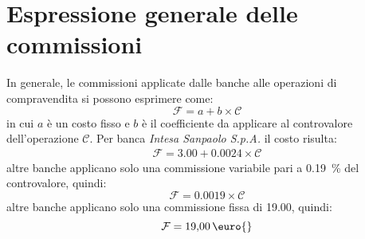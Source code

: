 \documentclass[12pt,a4paper]{article}
\newcommand{\IntesaSanpaolo}[0]{\emph{Intesa Sanpaolo S.p.A.}}
\newcommand{\Eur}[1]{\qty{#1}{\text{\euro{}}}}
\newcommand{\Cop}{\mathcal{C}}
\newcommand{\Fop}{\mathcal{F}}
\begin{document}

\appendix
\section{Espressione generale delle commissioni}


In  generale, le  commissioni applicate  dalle banche  alle operazioni  di compravendita  si possono
esprimere come:
\begin{equation*}
  \Fop{} = a + b \times{} \Cop{}
\end{equation*}
in cui \(a\) è un costo fisso e \(b\) è il coefficiente da applicare al controvalore dell'operazione
\(\Cop{}\).  Per banca \IntesaSanpaolo{} il costo risulta:
\begin{align*}
  \Fop{} = \num{3,00} + \num{0,0024} \times{} \Cop{}
\end{align*}
altre banche applicano  solo una commissione variabile pari a  \qty{0,19}{\percent} del controvalore,
quindi:
\begin{equation*}
  \Fop{} = \num{0,0019} \times{} \Cop{}
\end{equation*}
altre banche applicano solo una commissione fissa di \Eur{19,00}, quindi:
\begin{equation*}
  \Fop{} = \Eur{19,00}
\end{equation*}
\end{document}
